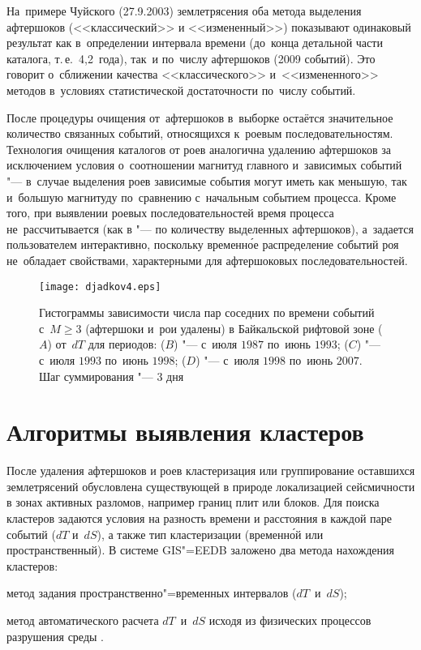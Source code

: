 \documentclass[twoside]{article}
\begin{document}
На~примере Чуйского (27.9.2003) землетрясения оба метода выделения афтершоков
(<<классический>> и <<измененный>>) показывают одинаковый результат как в~определении
интервала времени (до~конца детальной части каталога, т.\,е.\ 4,2~года), так~и
по~числу афтершоков (2009 событий).
Это говорит о~сближении качества <<классического>>
и~<<изменен\-ного>> методов в~условиях статистической достаточности по~числу событий.

После процедуры очищения от~афтершоков в~выборке остаётся значительное количество
связанных событий, относящихся к~роевым последо\-вательностям.
Технология очищения
каталогов от роев аналогична удалению афтершоков за исключением условия о~соотношении
магнитуд главного и~зависимых событий "--- в~случае выделения роев зависимые события
могут иметь как меньшую, так и~большую магнитуду по~сравнению с~начальным событием
процесса.
Кроме того, при выявлении роевых последовательностей время процесса не~рассчитывается
(как в \cite{author86} "--- по количеству выделенных афтершоков), а~задается пользователем интерактивно,
поскольку временн\'{о}е распределение событий роя не~обладает свойствами, характерными для
афтершоковых последовательностей.
\begin{figure}[t]\centering
\texttt{[image: djadkov4.eps]}
\caption{Гистограммы зависимости числа пар соседних по времени событий
с~$M\geq3$ (афтершоки и~рои удалены) в Байкальской рифтовой зоне ($A$) от~$dT$
для периодов: ($B$) "--- с~июля $1987$ по~июнь $1993$; ($C$) "---
с~июля $1993$ по~июнь $1998$; ($D$) "--- с~июля $1998$ по~июнь $2007$.
Шаг суммирования "--- $3$ дня}
\end{figure}

\section{Алгоритмы выявления кластеров}
После удаления афтершоков и роев кластеризация или группирование оставшихся землетрясений
обусловлена существующей в природе ло\-ка\-ли\-зацией сейсмичности в зонах активных \mbox{разломов},
например границ плит или блоков. Для поиска клас\-те\-ров задаются условия на разность
времени и расстояния в каждой паре событий ($dT$ и~$dS$), а также тип кластеризации (временн\'{о}й
или пространственный). В системе GIS"=EEDB заложено два метода нахождения кластеров:

\begin{enumerate*}
\item %
метод задания пространственно"=временных интервалов ($dT$~и~$dS$);
\item %
метод автоматического расчета $dT$~и~$dS$
исходя из физических процессов разрушения среды \cite{kuksenko,authors85}.
\end{enumerate*}
\end{document}
